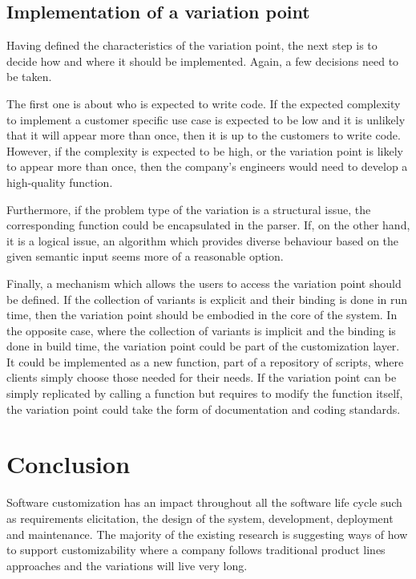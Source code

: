 \subsection{Implementation of a variation point} 

Having defined the characteristics of the variation point, the next step is to decide how and where it should be implemented. Again, a few decisions need to be taken.

The first one is about who is expected to write code. If the expected complexity to implement a customer specific use case is expected to be low and it is unlikely that it will appear more than once, then it is up to the customers to write code. However, if the complexity is expected to be high, or the variation point is likely to appear more than once, then the company's engineers would need to develop a high-quality function.


Furthermore, if the problem type of the variation is a structural issue, the corresponding function could be encapsulated in the parser. If, on the other hand, it is a logical issue, an algorithm which provides diverse behaviour based on the given semantic input seems more of a reasonable option. 

Finally, a mechanism which allows the users to access the variation point should be defined. If the collection of variants is explicit and their binding is done in run time, then the variation point should be embodied in the core of the system. In the opposite case, where the collection of variants is implicit and the binding is done in build time, the variation point could be part of the customization layer. It could be implemented as a new function, part of a repository of scripts, where clients simply choose those needed for their needs. If the variation point can be simply replicated by calling a function but requires to modify the function itself, the variation point could take the form of documentation and coding standards. 



\section{ Conclusion}\label{sec:conclusion}

Software customization has an impact throughout all the software life cycle such as requirements elicitation, the design of the system, development, deployment and maintenance. The majority of the existing research is suggesting ways of how to support customizability where a company follows traditional product lines approaches and the variations will live very long. 

